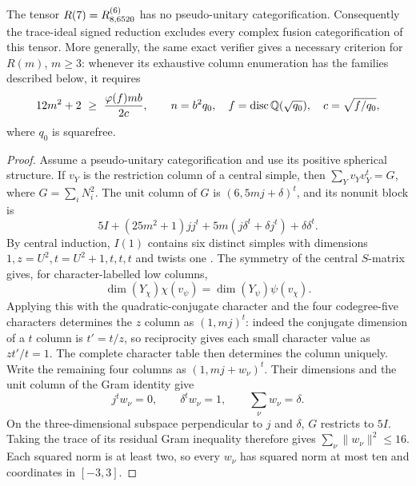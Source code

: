 \begin{proposition}
\label{prop:quadratic-gauss-family}
The tensor $R(7)=R^{(6)}_{8,6520}$ has no pseudo-unitary categorification.
Consequently the trace-ideal signed reduction excludes every complex
fusion categorification of this tensor.
More generally, the same exact verifier gives a necessary criterion for
$R(m)$, $m\ge3$: whenever its exhaustive column enumeration has the
families described below, it requires
\[
 12m^2+2\ \ge\ \frac{\varphi(f)m b}{2c},\qquad
 n=b^2q_0,\quad f=\operatorname{disc}\QQ(\sqrt{q_0}),\quad
 c=\sqrt{f/q_0},
\]
where $q_0$ is squarefree.
\end{proposition}
\begin{proof}
Assume a pseudo-unitary categorification and use its positive spherical
structure.  If $v_Y$ is the restriction column of a central simple, then
$\sum_Yv_Yv_Y^t=G$, where $G=\sum_iN_i^2$.
The unit column of $G$ is $(6,5mj+\delta)^t$, and its nonunit block is
\[
 5I+(25m^2+1)jj^t+5m(j\delta^t+\delta j^t)+\delta\delta^t.
\]
By central induction, $I(1)$ contains six distinct simples with dimensions
$1,z=U^2,t=U^2+1,t,t,t$ and twists one
\cite[Theorems 2.5 and 2.13]{Ostrik3}.
The symmetry of the central $S$-matrix gives, for character-labelled low
columns,
\[
 \dim(Y_\chi)\chi(v_\psi)=\dim(Y_\psi)\psi(v_\chi).
\]
Applying this with the quadratic-conjugate character and the four
codegree-five characters determines the $z$ column as $(1,mj)^t$:
indeed the conjugate dimension of a $t$ column is $t'=t/z$, so
reciprocity gives each small character value as $zt'/t=1$.  The complete
character table then determines the column uniquely.  Write the remaining four columns as
$(1,mj+w_\nu)^t$.  Their dimensions and the unit column of the Gram identity
give
\[
 j^tw_\nu=0,\qquad \delta^tw_\nu=1,\qquad
 \sum_\nu w_\nu=\delta.
\]
On the three-dimensional subspace perpendicular to $j$ and $\delta$,
$G$ restricts to $5I$.  Taking the trace of its residual Gram inequality
therefore gives $\sum_\nu\|w_\nu\|^2\le16$.  Each squared norm is at least
two, so every $w_\nu$ has squared norm at most ten and coordinates in
$[-3,3]$.


\end{proof}
